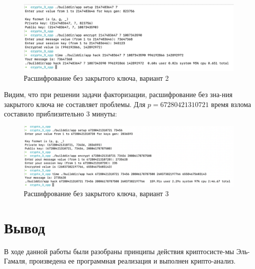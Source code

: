 \documentclass[a4paper]{article}
\begin{document}
  \begin{figure}[H]
    \centering
    \includegraphics[width=\textwidth]{15_5}
    \caption{Расшифрование без закрытого ключа, вариант 2}
  \end{figure}

  Видим, что при решении задачи факторизации, расшифрование без зна-ния закрытого ключа не составляет проблемы.
  Для $p = 67280421310721$ время взлома составило приблизительно 3 минуты:
  \begin{figure}[H]
    \centering
    \includegraphics[width=\textwidth]{15_6}
    \caption{Расшифрование без закрытого ключа, вариант 3}
  \end{figure}

  \newpage
  \section{Вывод}

  В ходе данной работы были разобраны принципы действия криптосисте-мы Эль-Гамаля,
  произведена ее программная реализация и выполнен крипто-анализ.
\end{document}
